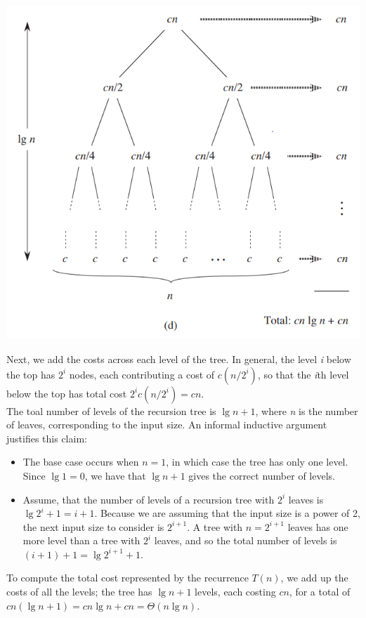 \documentclass{report}
\begin{document}
\begin{itemize}
\begin{center}
        \includegraphics[width = 10 cm]{../entities/merge_sort_recursion_tree.png}
    \end{center}
    Next, we add the costs across each level of the tree. In general, the level \textit{i} below the top has $2^i$ nodes, each contributing a cost of $c(n/2^i)$, so that the \textit{i}th level below the top has total cost $2^ic(n/2^i) = cn$. \\
    The toal number of levels of the recursion tree is $\lg n + 1$, where \textit{n} is the number of leaves, corresponding to the input size. An informal inductive argument justifies this claim:
    \begin{itemize}
        \item The base case occurs when $n = 1$, in which case the tree has only one level. Since $\lg 1 = 0$, we have that $\lg n + 1$ gives the correct number of levels.
        \item Assume, that the number of levels of a recursion tree with $2^i$ leaves is $\lg 2^i + 1 = i + 1$. Because we are assuming that the input size is a power of 2, the next input size to consider is $2^{i + 1}$. A tree with $n = 2^{i + 1}$ leaves has one more level than a tree with $2^i$ leaves, and so the total number of levels is $(i + 1) + 1 = \lg 2^{i + 1} + 1$.
    \end{itemize}
    To compute the total cost represented by the recurrence $T(n)$, we add up the costs of all the levels; the tree has $\lg n + 1$ levels, each costing $cn$, for a total of $cn(\lg n + 1) = cn \lg n + cn = \Theta(n \lg n)$.
\end{itemize}
\end{document}
